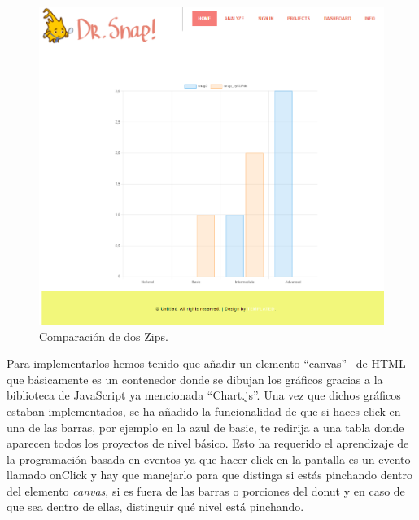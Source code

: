 \documentclass[a4paper, 12pt]{book}
\begin{document}
\begin{itemize}
         \begin{figure}[h]
            \centering
            \includegraphics[scale=0.4]{img/comparar.PNG}
            \caption{Comparación de dos Zips.}\label{figura:dshboard}
        \end{figure}
       
    \end{itemize}
    Para implementarlos hemos tenido que añadir un elemento ``canvas''~ de HTML que básicamente es un contenedor donde se dibujan los gráficos gracias a la biblioteca de JavaScript ya mencionada ``Chart.js''. Una vez que dichos gráficos estaban implementados, se ha añadido la funcionalidad de que si haces click en una de las barras, por ejemplo en la azul de basic, te redirija a una tabla donde aparecen todos los proyectos de nivel básico. Esto ha requerido el aprendizaje de la programación basada en eventos ya que hacer click en la pantalla es un evento llamado onClick y hay que manejarlo para que distinga si estás pinchando dentro del elemento \textit{canvas}, si es fuera de las barras o porciones del donut y en caso de que sea dentro de ellas, distinguir qué nivel está pinchando.



\end{document}
